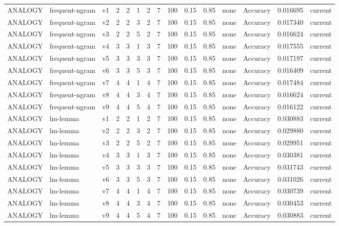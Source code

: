 \documentclass{article}
\begin{document}
\begin{xltabular}{\linewidth}{@{}lYcrrrrrrrrYlrl@{}}
\bottomrule
\endlastfoot
ANALOGY & frequent-ngram & v1 & 2 & 2 & 1 & 2 & 7 & 100 & 0.15 & 0.85 & none & Accuracy & 0.016695 & current \\
ANALOGY & frequent-ngram & v2 & 2 & 2 & 3 & 2 & 7 & 100 & 0.15 & 0.85 & none & Accuracy & 0.017340 & current \\
ANALOGY & frequent-ngram & v3 & 2 & 2 & 5 & 2 & 7 & 100 & 0.15 & 0.85 & none & Accuracy & 0.016624 & current \\
ANALOGY & frequent-ngram & v4 & 3 & 3 & 1 & 3 & 7 & 100 & 0.15 & 0.85 & none & Accuracy & 0.017555 & current \\
ANALOGY & frequent-ngram & v5 & 3 & 3 & 3 & 3 & 7 & 100 & 0.15 & 0.85 & none & Accuracy & 0.017197 & current \\
ANALOGY & frequent-ngram & v6 & 3 & 3 & 5 & 3 & 7 & 100 & 0.15 & 0.85 & none & Accuracy & 0.016409 & current \\
ANALOGY & frequent-ngram & v7 & 4 & 4 & 1 & 4 & 7 & 100 & 0.15 & 0.85 & none & Accuracy & 0.017484 & current \\
ANALOGY & frequent-ngram & v8 & 4 & 4 & 3 & 4 & 7 & 100 & 0.15 & 0.85 & none & Accuracy & 0.016624 & current \\
ANALOGY & frequent-ngram & v9 & 4 & 4 & 5 & 4 & 7 & 100 & 0.15 & 0.85 & none & Accuracy & 0.016122 & current \\
ANALOGY & lm-lemma & v1 & 2 & 2 & 1 & 2 & 7 & 100 & 0.15 & 0.85 & none & Accuracy & 0.030883 & current \\
ANALOGY & lm-lemma & v2 & 2 & 2 & 3 & 2 & 7 & 100 & 0.15 & 0.85 & none & Accuracy & 0.029880 & current \\
ANALOGY & lm-lemma & v3 & 2 & 2 & 5 & 2 & 7 & 100 & 0.15 & 0.85 & none & Accuracy & 0.029951 & current \\
ANALOGY & lm-lemma & v4 & 3 & 3 & 1 & 3 & 7 & 100 & 0.15 & 0.85 & none & Accuracy & 0.030381 & current \\
ANALOGY & lm-lemma & v5 & 3 & 3 & 3 & 3 & 7 & 100 & 0.15 & 0.85 & none & Accuracy & 0.031743 & current \\
ANALOGY & lm-lemma & v6 & 3 & 3 & 5 & 3 & 7 & 100 & 0.15 & 0.85 & none & Accuracy & 0.031026 & current \\
ANALOGY & lm-lemma & v7 & 4 & 4 & 1 & 4 & 7 & 100 & 0.15 & 0.85 & none & Accuracy & 0.030739 & current \\
ANALOGY & lm-lemma & v8 & 4 & 4 & 3 & 4 & 7 & 100 & 0.15 & 0.85 & none & Accuracy & 0.030453 & current \\
ANALOGY & lm-lemma & v9 & 4 & 4 & 5 & 4 & 7 & 100 & 0.15 & 0.85 & none & Accuracy & 0.030883 & current \\

\end{xltabular}
\end{document}
